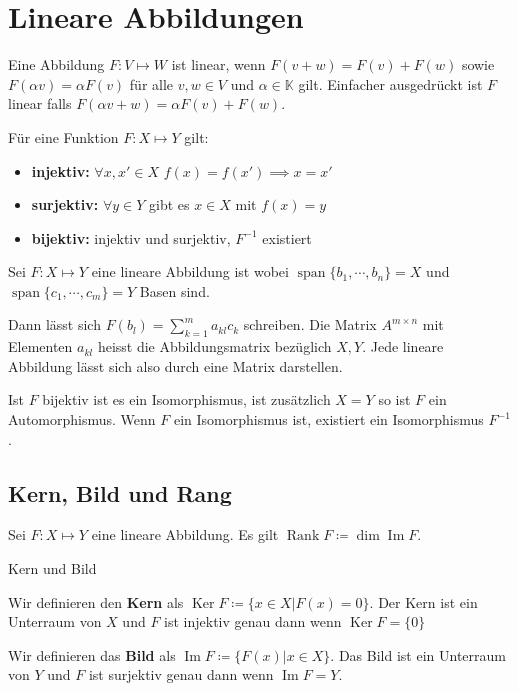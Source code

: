 \documentclass[a4paper,10pt]{article}
\DeclareMathOperator{\Rank}{Rank}
\DeclareMathOperator{\Image}{Im}
\DeclareMathOperator{\Kernel}{Ker}
\DeclareMathOperator{\Span}{span}
\def\K{\mathbb{K}}
\begin{document}
\section{Lineare Abbildungen}

Eine Abbildung $F: V \mapsto W$ ist linear, wenn $F(v + w) = F(v) + F(w)$ sowie $F(\alpha v) = \alpha F(v)$ für alle $v, w \in V$ und $\alpha \in \K$ gilt. Einfacher ausgedrückt ist $F$ linear falls $F(\alpha v + w) = \alpha F(v) + F(w)$. 

Für eine Funktion $F: X \mapsto Y$ gilt:
\begin{itemize}
  \item \textbf{injektiv:} $\forall x, x' \in X$ $f(x) = f(x') \implies x = x'$
  \item \textbf{surjektiv:} $\forall y \in Y$ gibt es $x \in X$ mit $f(x) = y$
  \item \textbf{bijektiv:} injektiv und surjektiv, $F^{-1}$ existiert
\end{itemize}

Sei $F: X \mapsto Y$ eine lineare Abbildung ist wobei $\Span \{ b_1, \cdots, b_n \} = X$ und $\Span \{ c_1, \cdots, c_m \} = Y$ Basen sind.

Dann lässt sich $F(b_l) = \sum_{k=1}^m a_{kl} c_k$ schreiben. Die Matrix $A^{m \times n}$ mit Elementen $a_{kl}$ heisst die Abbildungsmatrix bezüglich $X, Y$. Jede lineare Abbildung lässt sich also durch eine Matrix darstellen.

Ist $F$ bijektiv ist es ein Isomorphismus, ist zusätzlich $X = Y$ so ist $F$ ein Automorphismus. Wenn $F$ ein Isomorphismus ist, existiert ein Isomorphismus $F^{-1}$.

\subsection{Kern, Bild und Rang}


Sei $F: X \mapsto Y$ eine lineare Abbildung. Es gilt $\Rank F \coloneqq \dim \Image F$.

\begin{mainbox}{Kern und Bild}

  Wir definieren den \textbf{Kern} als $\Kernel F \coloneqq \{x \in X | F(x) = 0\}$. Der Kern ist ein Unterraum von $X$ und $F$ ist injektiv genau dann wenn $\Kernel F = \{0\}$

  Wir definieren das \textbf{Bild} als $\Image F \coloneqq \{F(x) | x \in X\}$. Das Bild ist ein Unterraum von $Y$ und $F$ ist surjektiv genau dann wenn $\Image F = Y$.
\end{mainbox}
\end{document}
